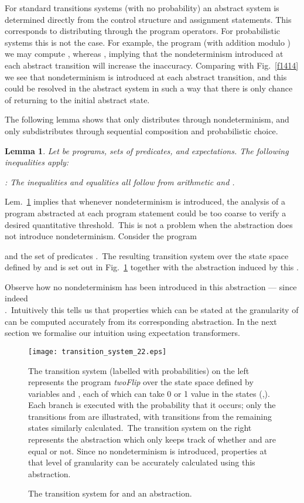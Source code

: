 \documentclass[numbers,copyright,creativecommons]{eptcs}
\newcommand{\figg}[1]{Fig.~\ref{#1}}
\newtheorem{Lems}{Lemma} \newcommand{\Lem}[1]{Lem.~\ref{#1}}
\newcommand{\Proof}{\noindent{\bf Proof}: \quad}
\begin{document}
For standard transitions systems (with no probability) an abstract system  is determined directly from the control structure and assignment statements. This corresponds to  distributing through the program operators.  For probabilistic systems this is not the case. For example, the program  (with addition modulo ) we may compute , whereas , implying that the nondeterminism introduced at each abstract transition will increase the inaccuracy. Comparing with \figg{f1414} we see that nondeterminism is introduced at each abstract transition, and this could be resolved in the abstract system in such a way that there is only  chance of returning to the initial abstract state.

 The following lemma shows that  only distributes through nondeterminism, and only subdistributes through sequential composition and probabilistic choice.

\begin{Lems}\label{l1508}
Let  be  programs,   sets of predicates, and  expectations. The following inequalities apply:



\Proof
The inequalities and equalities all follow from arithmetic and .
\end{Lems}

\Lem{l1508} implies that whenever nondeterminism is introduced, the analysis of a program abstracted at each program statement could be too coarse to verify a desired quantitative threshold.\ This is not a problem when the abstraction
does not introduce nondeterminism. Consider the program

and the set of predicates .\ The resulting transition system over the state space defined by  and  is set out in \figg{f1716} together with the abstraction induced by this .

Observe how no nondeterminism has been introduced in this abstraction --- since indeed \\.\ Intuitively this tells us that properties which can be stated at the granularity of  can be computed accurately from its corresponding abstraction. In the next section we formalise our intuition using  expectation transformers.
\begin{figure}
\begin{center}
\texttt{[image: transition\_system\_22.eps]}
\end{center}

\small{The transition system (labelled with probabilities) on the left represents the program \textit{twoFlip} over the state space defined by variables  and , each of which can take 0 or 1 value in the states (,). Each branch is executed with the probability that it occurs; only the transitions from  are illustrated, with transitions from the remaining states similarly calculated.\ The transition system on the right represents the abstraction which only keeps track of whether  and  are equal or not. Since no nondeterminism is introduced, properties at that level of granularity can be accurately calculated using this abstraction.}
\caption{The transition system for  and an abstraction.}\label{f1716}
\end{figure}
\end{document}
